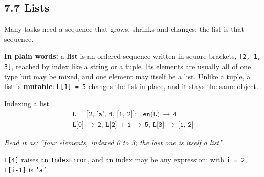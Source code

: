 \documentclass[11pt]{article}
\begin{document}
\begin{keepsection}
\section{7.7 Lists}

Many tasks need a sequence that grows, shrinks and changes; the list is that sequence.

\begin{plainbox}\textbf{In plain words:} a \textbf{list} is an ordered sequence written in square brackets, \texttt{[2, 1, 3]}, reached by index like a string or a tuple. Its elements are usually all of one type but may be mixed, and one element may itself be a list. Unlike a tuple, a list is \textbf{mutable}: \texttt{L[1] = 5} changes the list in place, and it stays the same object.\end{plainbox}

\begin{equationcard}{Indexing a list}
\[ \begin{gathered} \texttt{L = [2, 'a', 4, [1, 2]]}:\, \texttt{len(L)}\, \to \, \texttt{4} \\ \texttt{L[0]}\, \to \, \texttt{2},\, \texttt{L[2] + 1}\, \to \, \texttt{5},\, \texttt{L[3]}\, \to \, \texttt{[1, 2]} \end{gathered} \]
{\small \emph{Read it as: “four elements, indexed 0 to 3; the last one is itself a list”.}\par  \texttt{L[4]} raises an \texttt{IndexError}, and an index may be any expression: with \texttt{i = 2}, \texttt{L[i-1]} is \texttt{'a'}.}
\end{equationcard}


\end{keepsection}
\end{document}
